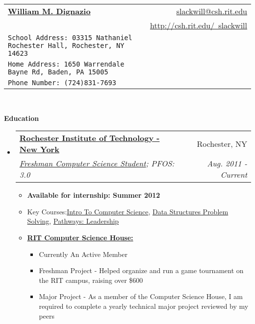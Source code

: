 \documentclass[letterpaper,11pt]{article}
\makeatletter
\newcommand{\resitem}[1]{\item #1 \vspace{-2pt}}
\newcommand{\resheading}[1]{{\large \colorbox{mygrey}{\begin{minipage}{\textwidth}{\textbf{#1 \vphantom{p\^{E}}}}\end{minipage}}}}
\newcommand{\ressubheading}[4]{
\begin{tabular*}{6.5in}{l@{\extracolsep{\fill}}r}
		\textbf{#1} & #2 \\
		\textit{#3} & \textit{#4} \\
\end{tabular*}\vspace{-6pt}}
\makeatother
\begin{document}
\newcommand{\mywebheader}{
\begin{tabular*}{7in}{l@{\extracolsep{\fill}}r}
	\textbf{\href{http://csh.rit.edu/~slackwill}{\Huge William M. Dignazio}} & \href{mailto:slackwill@csh.rit.edu}{slackwill@csh.rit.edu}\\ &
	\href{http://csh.rit.edu/~slackwill}{http://csh.rit.edu/~slackwill} \\
	{\footnotesize \texttt{{School Address: 03315 Nathaniel Rochester Hall,
Rochester, NY 14623}}} & \\
	{\footnotesize \texttt{{Home Address: 1650 Warrendale Bayne Rd, Baden, PA 15005}}} & \\
	{\footnotesize \texttt{{Phone Number: (724)831-7693}}} & 

	\end{tabular*}
\\
\vspace{0.1in}}

\mywebheader

\resheading{Education}
	\begin{itemize}
		\item
			\ressubheading{\href{http://www.rit.edu}{Rochester Institute of Technology - New York}}{Rochester, NY}{\href{http://www.cs.rit.edu/}{Freshman Computer Science Student}; {PFOS: 3.0}}{Aug. 2011 - Current}
				{ \footnotesize
				\begin{itemize}
					\resitem{\textbf{Available for internship: Summer 2012}}
					\resitem{Key Courses:\href{https://register.rit.edu/courseSchedule/20111/40/03/241/05}{Intro To Computer Science}, \href{https://register.rit.edu/courseSchedule/20112/40/03/242/05}{Data Structures Problem Solving}, \href{https://register.rit.edu/courseSchedule/20112/17/20/053/03}{Pathways: Leadership}}
					\resitem{\textbf{\href{http://csh.rit.edu/}{RIT Computer Science House:}}} 
						\begin{itemize}
							\resitem{{Currently An Active Member}}						
							\resitem{{Freshman Project} - Helped organize and run a game tournament on the RIT campus, raising over \$600} 
							\resitem{{Major Project} - As a member of the Computer Science House, I am required to complete a yearly technical major project reviewed by my peers}
						\end{itemize}
				\end{itemize}
				}
	\end{itemize} %
\end{document}
